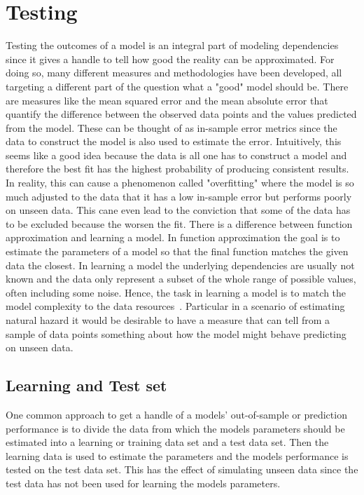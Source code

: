 
\chapter{Testing} %

\label{Chapter3} %


Testing the outcomes of a model is an integral part of modeling dependencies since it gives a handle to tell how good the reality can be approximated.
For doing so, many different measures and methodologies have been developed, all targeting a different part of the question what a "good" model should be. There are measures like the mean squared error and the mean absolute error that quantify the difference between the observed data points and the values predicted from the model. These can be thought of as in-sample error metrics since the data to construct the model is also used to estimate the error. Intuitively, this seems like a good idea because the data is all one has to construct a model and therefore the best fit has the highest probability of producing consistent results. In reality, this can cause a phenomenon called "overfitting" where the model is so much adjusted to the data that it has a low in-sample error but performs poorly on unseen data. This cane even lead to the conviction that some of the data has to be excluded because the worsen the fit.
There is a difference between function approximation and learning a model. In function approximation the goal is to estimate the parameters of a model so that the final function matches the given data the closest. In learning a model the underlying dependencies are usually not known and the data only represent a subset of the whole range of possible values, often including some noise. Hence, the task in learning a model is to match the model complexity  to the data resources~\citep{LearningFromData}. Particular in a scenario of estimating natural hazard it would be desirable to have a measure that can tell from a sample of data points something about how the model might behave predicting on unseen data.\\


\section{Learning and Test set}
One common approach to get a handle of a models' out-of-sample or prediction performance is to divide the data from which the models parameters should be estimated into a learning or training data set and a test data set. Then the learning data is used to estimate the parameters and the models performance is tested on the test data set. This has the effect of simulating unseen data since the test data has not been used for learning the models parameters.

